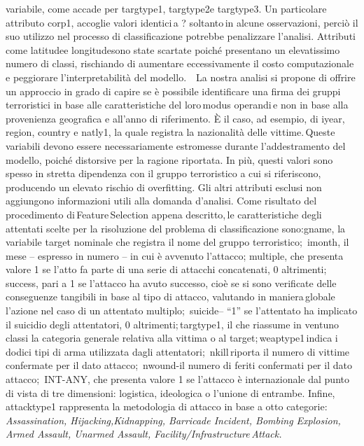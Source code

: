 \documentclass[fleqn,10pt]{SelfArx} %
\begin{document}
variabile, come accade per targtype1, targtype2e targtype3. 
Un particolare attributo corp1, accoglie valori identici a ? soltanto in alcune osservazioni, perciò il suo utilizzo nel processo di classificazione potrebbe penalizzare l’analisi.  
Attributi come latitudee longitudesono state scartate poiché presentano un elevatissimo numero di classi, rischiando di aumentare eccessivamente il costo computazionale e peggiorare l’interpretabilità del modello.     
La nostra analisi si propone di offrire un approccio in grado di capire se è possibile identificare una firma dei gruppi terroristici in base alle caratteristiche del loro modus operandi e non in base alla provenienza geografica e all’anno di riferimento. È il caso, ad esempio, di iyear, region, country e natly1, la quale registra la nazionalità delle vittime. Queste variabili devono essere necessariamente estromesse durante l’addestramento del modello, poiché distorsive per la ragione riportata. In più, questi valori sono spesso in stretta dipendenza con il gruppo terroristico a cui si riferiscono, producendo un elevato rischio di overfitting. 
Gli altri attributi esclusi non aggiungono informazioni utili alla domanda d’analisi. 
Come risultato del procedimento di Feature Selection appena descritto, le caratteristiche degli attentati scelte per la risoluzione del problema di classificazione sono:gname, la variabile target nominale che registra il nome del gruppo terroristico;  imonth, il mese – espresso in numero – in cui è avvenuto l’attacco;  multiple, che presenta valore 1 se l’atto fa parte di una serie di attacchi concatenati, 0 altrimenti;  success, pari a 1 se l’attacco ha avuto successo, cioè se si sono verificate delle conseguenze tangibili in base al tipo di attacco, valutando in maniera globale l’azione nel caso di un attentato multiplo;  suicide– “1” se l’attentato ha implicato il suicidio degli attentatori, 0 altrimenti; targtype1, il che riassume in ventuno classi la categoria generale relativa alla vittima o al target; weaptype1 indica i dodici tipi di arma utilizzata dagli attentatori;  nkill riporta il numero di vittime confermate per il dato attacco;  nwound-il numero di feriti confermati per il dato attacco;  INT-ANY, che presenta valore 1 se l’attacco è internazionale dal punto di vista di tre dimensioni: logistica, ideologica o l’unione di entrambe. Infine, attacktype1 rappresenta la metodologia di attacco in base a otto categorie: \textit{Assassination, Hijacking,Kidnapping, Barricade Incident, Bombing Explosion, Armed Assault, Unarmed Assault, Facility/Infrastructure Attack.}
\end{document}
